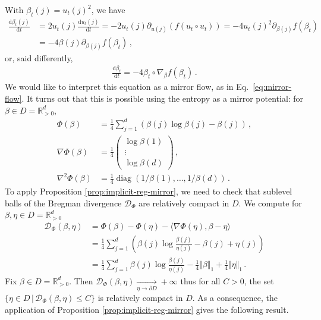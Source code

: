 \documentclass[11pt,reqno]{article}
\DeclareMathOperator*{\diag}{diag}
\newcommand{\diff}{\mathrm{d}}
\newcommand{\R}{\mathbb{R}}
\newcommand{\cD}{\mathcal{D}}
\renewcommand{\leq}{\leqslant}
\numberwithin{equation}{section}
\theoremstyle{plain}
\theoremstyle{definition}
\theoremstyle{remark}
\begin{document}
With $\beta_t(j) = u_t(j)^2$, we have
\begin{align*}
	\frac{\diff \beta_t(j)}{\diff t} &= 2 u_t(j) \frac{\diff u_t(j)}{\diff t} = - 2 u_t(j) \partial_{u(j)} \left( f(u_t\circ u_t) \right) = - 4 u_t(j)^2 \partial_{\beta(j)} f(\beta_t) \\
	&= -4 \beta(j) \partial_{\beta(j)} f(\beta_t) \, ,
\end{align*}
or, said differently, 
\begin{align}
	\label{eq:mirror-flow-dln}
	\frac{\diff \beta_t}{\diff t} = -4 \beta_t \circ \nabla_\beta f(\beta_t) \, .
\end{align}
We would like to interpret this equation as a mirror flow, as in Eq.~\eqref{eq:mirror-flow}. It turns out that this is possible using the entropy as a mirror potential: for $\beta \in D = \R^d_{>0}$,
\begin{align*}
	\Phi(\beta) &= \frac{1}{4}\sum_{j=1}^{d}\left( \beta(j) \log \beta(j) - \beta(j) \right) \, , \\
\nabla \Phi(\beta) &=  \frac{1}{4} \begin{pmatrix}
	\log \beta(1) \\ \vdots \\ \log \beta(d)
\end{pmatrix} \, , \\
\nabla^2 \Phi(\beta) &= \frac{1}{4} \diag(1/\beta(1), \dots, 1/\beta(d)) \, . 
\end{align*}
To apply Proposition \ref{prop:implicit-reg-mirror}, we need to check that sublevel balls of the Bregman divergence $\cD_\Phi$ are relatively compact in $D$. We compute for $\beta, \eta \in D = \R^d_{>0}$
\begin{align*}
	\cD_\Phi(\beta, \eta) &= \Phi(\beta) - \Phi(\eta) - \langle \nabla \Phi(\eta), \beta - \eta \rangle \\
	&= \frac{1}{4}\sum_{j=1}^{d}\left( \beta(j) \log \frac{\beta(j)}{\eta(j)} - \beta(j) + \eta(j) \right) \\
	&= \frac{1}{4}\sum_{j=1}^{d} \beta(j) \log \frac{\beta(j)}{\eta(j)} - \frac{1}{4 } \Vert \beta \Vert_1 + \frac{1}{4} \Vert \eta \Vert_1 \, .
\end{align*}
Fix $\beta \in D = \R^d_{>0}$. Then $\cD_\Phi(\beta, \eta) \xrightarrow[\eta \to \partial D]{} +\infty$ thus for all $C>0$, the set $\{\eta \in D \, \vert \, \cD_\Phi(\beta, \eta) \leq C\}$ is relatively compact in $D$. As a consequence, the application of Proposition \ref{prop:implicit-reg-mirror} gives the following result. 
\end{document}
